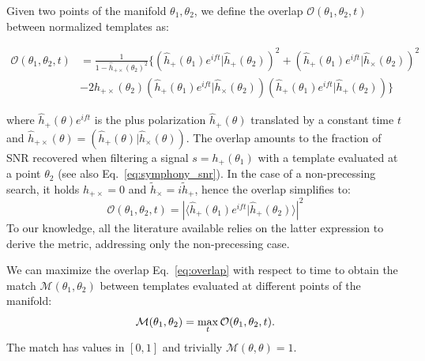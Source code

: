 \documentclass[twocolumn,showpacs,preprintnumbers,nofootinbib,prd,
superscriptaddress,10pt]{revtex4-2}
\newcommand{\scalar}[2]{\langle #1|#2 \rangle}
\newcommand{\rescalar}[2]{( #1 |#2 )}
\newcommand{\rescalarwide}[2]{\left( #1 \lvert #2 \right)}
\begin{document}
Given two points of the manifold $\theta_1,\theta_2$, we define the overlap $\mathcal{O}(\theta_1,\theta_2, t)$ between normalized templates as:
\begin{widetext}
	\begin{align}\label{eq:overlap}
		\mathcal{O}(\theta_1,\theta_2, t) &= \frac{1}{1- \hat{h}_{+\times}(\theta_2)^2} 
		\biggl\{ \rescalarwide{\hat{h}_+(\theta_1)e^{i ft}}{\hat{h}_+(\theta_2)}^2 + \rescalarwide{\hat{h}_+(\theta_1)e^{i ft}}{\hat{h}_\times(\theta_2)}^2 \nonumber \\
		& -2h_{+\times}(\theta_2)\rescalarwide{\hat{h}_+(\theta_1)e^{i ft}}{\hat{h}_\times(\theta_2)}\rescalarwide{\hat{h}_+(\theta_1)e^{i ft}}{\hat{h}_+(\theta_2)} \biggl\}
	\end{align}
\end{widetext}
where $\hat{h}_+(\theta)e^{i ft}$ is the plus polarization $\hat{h}_+(\theta)$ translated by a constant time $t$ and $\hat{h}_{+\times}(\theta) = \rescalar{\hat{h}_+(\theta)}{\hat{h}_\times(\theta)}$.
The overlap amounts to the fraction of SNR recovered when filtering a signal $s=h_+(\theta_1)$ with a template evaluated at a point $\theta_2$ (see also Eq.~\eqref{eq:symphony_snr}).
In the case of a non-precessing search, it holds $h_{+\times} = 0$ and $\tilde{h}_\times = i \tilde{h}_+$, hence the overlap simplifies to:
\begin{equation}\label{eq:overlap_NP}
\mathcal{O}(\theta_1,\theta_2, t) = \left|\scalar{\hat{h}_+(\theta_1)e^{i ft}}{\hat{h}_+(\theta_2)} \right|^2
\end{equation}
To our knowledge, all the literature available \cite{owen_metric, Messenger:2008ta, Prix:2007ks, Brown:2012qf, Roy:2017oul, Coogan:2022qxs, Hanna:2022zpk} relies on the latter expression to derive the metric, addressing only the non-precessing case.

We can maximize the overlap Eq.~\eqref{eq:overlap} with respect to time to obtain the match $\mathcal{M}(\theta_1,\theta_2)$ between templates evaluated at different points of the manifold:
\begin{equation}\label{eq:match}
	\mathcal{M}(\theta_1,\theta_2) = \max_t \mathcal{O}(\theta_1,\theta_2, t). \\
\end{equation}
%
The match has values in $[0,1]$ and trivially $\mathcal{M}(\theta,\theta) = 1$.
\end{document}
